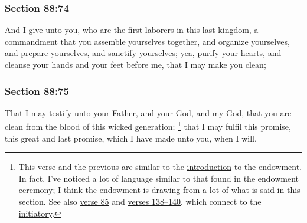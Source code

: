 	\subsubsection{Section 88:74} %
		\label{DC88-74}

		And I give unto you, who are the first laborers in this last kingdom, a commandment that you assemble yourselves together, and organize yourselves, and prepare yourselves, and sanctify yourselves; yea, purify your hearts, and cleanse your hands and your feet before me, that I may make you clean;


	\subsubsection{Section 88:75} %
		\label{DC88-75}

		That I may testify unto your Father, and your God, and my God, that you are clean from the blood of this wicked generation;%
			\footnote{%
				This verse and the previous are similar to the \hyperref[TEMPLE-ENDOWMENT-ENDOW-PRE-1990-INTRO]{introduction} to the endowment. In fact, I've noticed a lot of language similar to that found in the endowment ceremony; I think the endowment is drawing from a lot of what is said in this section. See also \hyperref[DC88-85]{verse 85} and \hyperref[DC88-138]{verses 138--140}, which connect to the \hyperref[TEMPLE-ENDOWMENT-INIT-PRE-2005]{initiatory}.
				}
		that I may fulfil this promise, this great and last promise, which I have made unto you, when I will.


